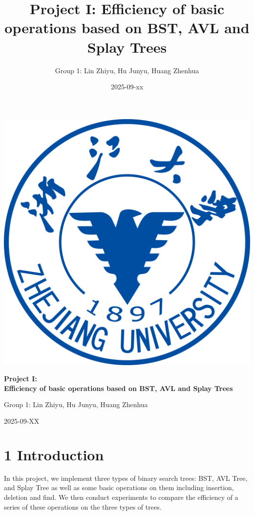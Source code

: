 \documentclass[
]{article}
\title{Project I: Efficiency of basic operations based on BST, AVL and
Splay Trees}
\author{Group 1: Lin Zhiyu, Hu Junyu, Huang Zhenhua}
\date{2025-09-xx}
\begin{document}
\maketitle

\thispagestyle{empty}
\begin{titlepage}
  \centering
  \vspace*{1cm}
  \includegraphics[width=0.35\paperwidth]{images/cover.png}\par
  \vspace{2cm}
  {\Huge\bfseries Project I:\\[0.5em]Efficiency of basic operations based on BST, AVL and Splay Trees\par}
  \vspace{1.5cm}
  {\Large Group 1: Lin Zhiyu, Hu Junyu, Huang Zhenhua\par}
  \vfill
  {\large 2025-09-XX\par}
\end{titlepage}
\clearpage
{}

\hypertarget{introduction}{%
\section{1 Introduction}\label{introduction}}

In this project, we implement three types of binary search trees: BST,
AVL Tree, and Splay Tree as well as some basic operations on them
including insertion, deletion and find. We then conduct experiments to
compare the efficiency of a series of these operations on the three
types of trees.
\end{document}
